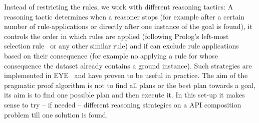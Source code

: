Instead of restricting the rules, we work with different reasoning tactics: A reasoning tactic determines when a reasoner stops 
(for example after a certain number of rule-applications  
or directly after one instance of the goal is found), it controls the order in which rules are applied 
(following Prolog's left-most selection rule~\cite{nilsson} or any other similar rule) and if can exclude rule applications based on their consequence (for example 
no applying a rule for whose consequence the dataset already contains a ground instance). Such strategies are implemented in EYE~\cite{eye} and have proven 
to be useful in practice. 
The aim of the pragmatic proof algorithm is not to find all plans or the best plan towards a goal, its aim is to find one possible plan and then execute it.
In this set-up it makes sense to try -- if needed -- different reasoning strategies on a API composition problem till one solution is found.



% 
% 
% 
% 
% 
% 
% 
% 
% 
% 
% 
% 
% 
% 
% 

